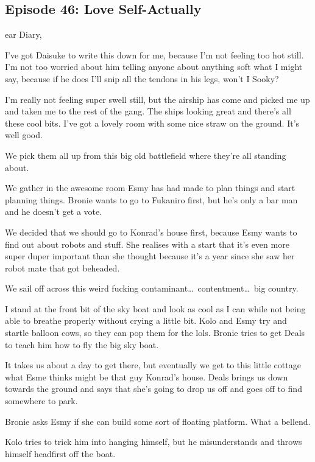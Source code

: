 \subsection{Episode 46: Love Self-Actually}

ear Diary,\medskip

I've got Daisuke to write this down for me, because I'm not feeling too hot still. I'm not too worried about him telling anyone about anything soft what I might say, because if he does I'll snip all the tendons in his legs, won't I Sooky?\medskip

I'm really not feeling super swell still, but the airship has come and picked me up and taken me to the rest of the gang. The ships looking great and there's all these cool bits. I've got a lovely room with some nice straw on the ground. It's well good.\medskip

We pick them all up from this big old battlefield where they're all standing about.\medskip

We gather in the awesome room Esmy has had made to plan things and start planning things. Bronie wants to go to Fukaniro first, but he's only a bar man and he doesn't get a vote.\medskip

We decided that we should go to Konrad's house first, because Esmy wants to find out about robots and stuff. She realises with a start that it's even more super duper important than she thought because it's a year since she saw her robot mate that got beheaded.\medskip

We sail off across this weird fucking contaminant\ldots\ contentment\ldots\ big country.\medskip

I stand at the front bit of the sky boat and look as cool as I can while not being able to breathe properly without crying a little bit. Kolo and Esmy try and startle balloon cows, so they can pop them for the lols. Bronie tries to get Deals to teach him how to fly the big sky boat.\medskip

It takes us about a day to get there, but eventually we get to this little cottage what Esme thinks might be that guy Konrad's house. Deals brings us down towards the ground and says that she's going to drop us off and goes off to find somewhere to park.\medskip

Bronie asks Esmy if she can build some sort of floating platform. What a bellend.\medskip

Kolo tries to trick him into hanging himself, but he misunderstands and throws himself headfirst off the boat.\medskip

